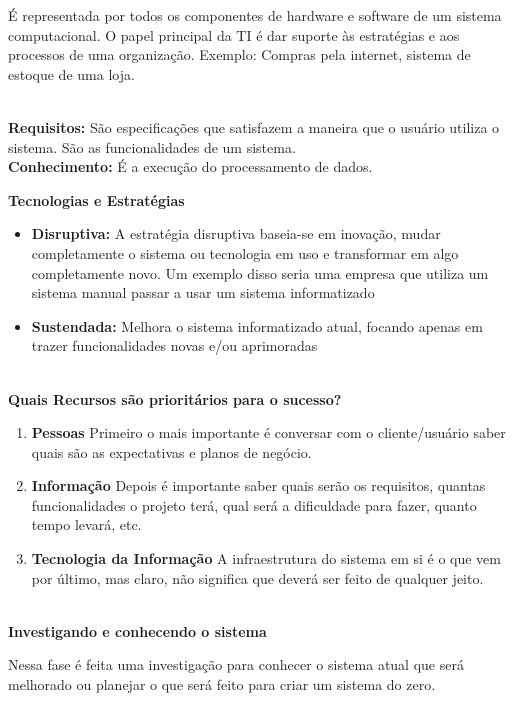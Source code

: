 \documentclass[12pt, a4paper]{article}
\begin{document}
É representada por todos os componentes de hardware e software 
de um sistema computacional.
O papel principal da TI é dar suporte às estratégias 
e aos processos de uma organização. Exemplo: Compras pela internet, 
sistema de estoque de uma loja.

\textbf{\\Requisitos:} São especificações que satisfazem a maneira que o usuário utiliza o sistema.
São as funcionalidades de um sistema.
\textbf{\\Conhecimento:} É a execução do processamento de dados.

\newpage
\vspace*{0.5cm}

\noindent
\textbf{Tecnologias e Estratégias}

\begin{itemize}
    \item \textbf{Disruptiva:} A estratégia disruptiva baseia-se em inovação, mudar completamente
    o sistema ou tecnologia em uso e transformar em algo completamente novo. Um exemplo disso 
    seria uma empresa que utiliza um sistema manual passar a usar um sistema informatizado
    \item \textbf{Sustendada:} Melhora o sistema informatizado atual, focando apenas em trazer 
    funcionalidades novas e/ou aprimoradas
\end{itemize}

\noindent
\textbf{\\Quais Recursos são prioritários para o sucesso?}

\begin{enumerate}[label*=\textbf{\arabic*}.]
    \item \textbf{Pessoas} Primeiro o mais importante é conversar com o cliente/usuário
    saber quais são as expectativas e planos de negócio.
    \item \textbf{Informação} Depois é importante saber quais serão os requisitos, 
    quantas funcionalidades o projeto terá, qual será a dificuldade para fazer, 
    quanto tempo levará, etc.
    \item \textbf{Tecnologia da Informação} A infraestrutura do sistema em si é o que vem por último,
    mas claro, não significa que deverá ser feito de qualquer jeito.
\end{enumerate}

\noindent
\textbf{\\Investigando e conhecendo o sistema}

Nessa fase é feita uma investigação para conhecer o sistema atual que será melhorado
ou planejar o que será feito para criar um sistema do zero.
\end{document}
